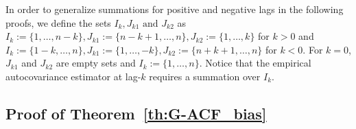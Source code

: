 \documentclass[12pt]{article}
\theoremstyle{remark}
\begin{document}

In order to generalize summations for positive and negative lags in the following proofs, we define the sets $I_k, J_{k1} \text{ and } J_{k2}$ as $ I_k := \{1, \dots, n-k\}, J_{k1} := \{n-k+1, \dots , n\}, J_{k2} := \{1, \dots, k\}$ for $k > 0$ and  $I_k := \{1-k, \dots, n\}, J_{k1} := \{1, \dots , -k\}, J_{k2} := \{n+k+1, \dots, n\}$ for $k < 0$. For $k=0$, $J_{k1}$ and $J_{k2}$ are empty sets and $I_k := \{1, \dots, n\}$. Notice that the empirical autocovariance estimator at lag-$k$ requires a summation over $I_k$. 

\subsection{Proof of Theorem~\ref{th:G-ACF_bias}} 
\label{appendix:bias}

\end{document}
